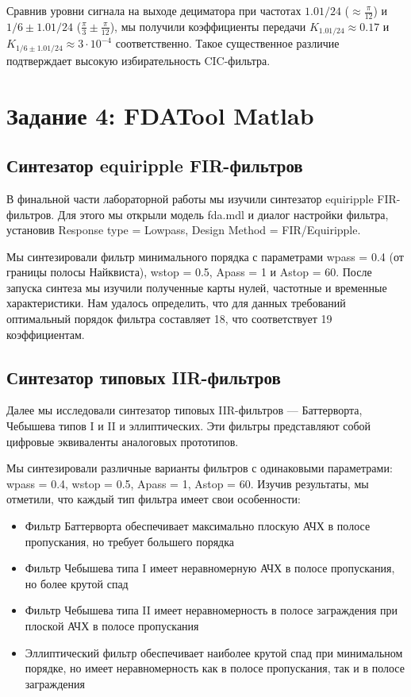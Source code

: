 Сравнив уровни сигнала на выходе дециматора при частотах $1.01/24$ ($\approx \frac{\pi}{12}$) и $1/6 \pm 1.01/24$ ($\frac{\pi}{3} \pm \frac{\pi}{12}$), мы получили коэффициенты передачи $K_{1.01/24} \approx 0.17$ и $K_{1/6 \pm 1.01/24} \approx 3 \cdot 10^{-4}$ соответственно. Такое существенное различие подтверждает высокую избирательность CIC-фильтра.

\section{Задание 4: FDATool Matlab}

\subsection{Синтезатор equiripple FIR-фильтров}
В финальной части лабораторной работы мы изучили синтезатор equiripple FIR-фильтров. Для этого мы открыли модель fda.mdl и диалог настройки фильтра, установив Response type = Lowpass, Design Method = FIR/Equiripple. 

Мы синтезировали фильтр минимального порядка с параметрами wpass = 0.4 (от границы полосы Найквиста), wstop = 0.5, Apass = 1 и Astop = 60. После запуска синтеза мы изучили полученные карты нулей, частотные и временные характеристики. Нам удалось определить, что для данных требований оптимальный порядок фильтра составляет 18, что соответствует 19 коэффициентам.

\subsection{Синтезатор типовых IIR-фильтров}
Далее мы исследовали синтезатор типовых IIR-фильтров — Баттерворта, Чебышева типов I и II и эллиптических. Эти фильтры представляют собой цифровые эквиваленты аналоговых прототипов.

Мы синтезировали различные варианты фильтров с одинаковыми параметрами: wpass = 0.4, wstop = 0.5, Apass = 1, Astop = 60. Изучив результаты, мы отметили, что каждый тип фильтра имеет свои особенности:
\begin{itemize}
    \item Фильтр Баттерворта обеспечивает максимально плоскую АЧХ в полосе пропускания, но требует большего порядка
    \item Фильтр Чебышева типа I имеет неравномерную АЧХ в полосе пропускания, но более крутой спад
    \item Фильтр Чебышева типа II имеет неравномерность в полосе заграждения при плоской АЧХ в полосе пропускания
    \item Эллиптический фильтр обеспечивает наиболее крутой спад при минимальном порядке, но имеет неравномерность как в полосе пропускания, так и в полосе заграждения
\end{itemize}


